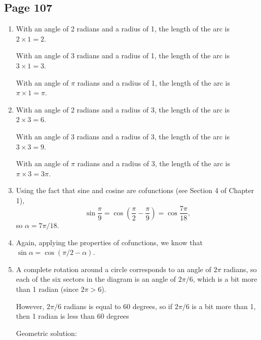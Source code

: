\documentclass{article}
\newenvironment{solutions}[1]
{\subsection*{#1}
 \begin{enumerate}[leftmargin=1.5em]}
{\end{enumerate}}
\newcommand{\solution}{\item}
\begin{document}
\begin{solutions}{Page 107}
\solution %
With an angle of 2 radians and a radius of 1, the length of the arc is $2 \times 1 = 2$.

With an angle of 3 radians and a radius of 1, the length of the arc is $3 \times 1 = 3$.

With an angle of $\pi$ radians and a radius of 1, the length of the arc is $\pi \times 1 = \pi$.

\solution %
With an angle of 2 radians and a radius of 3, the length of the arc is $2 \times 3 = 6$.

With an angle of 3 radians and a radius of 3, the length of the arc is $3 \times 3 = 9$.

With an angle of $\pi$ radians and a radius of 3, the length of the arc is $\pi \times 3 = 3\pi$.

\solution %
Using the fact that sine and cosine are cofunctions (see Section 4 of Chapter 1),
\[
\sin{\dfrac{\pi}{9}} = \cos\left(\dfrac{\pi}{2}-\dfrac{\pi}{9}\right) = \cos{\dfrac{7\pi}{18}},
\]
so $\alpha = 7\pi / 18$.

\solution %
Again, applying the properties of cofunctions, we know that $\sin{\alpha} = \cos\left(\pi/2 - \alpha\right)$.

\solution %
A complete rotation around a circle corresponds to an angle of $2\pi$ radians, so each of the six sectors in the diagram is an angle of $2\pi/6$, which is a bit more than 1 radian (since $2\pi > 6$). 

However, $2\pi/6$ radians is equal to 60 degrees, so if $2\pi/6$ is a bit more than 1, then 1 radian is less than 60 degrees

Geometric solution:
\begin{center}
\end{center}


\end{solutions}
\end{document}
